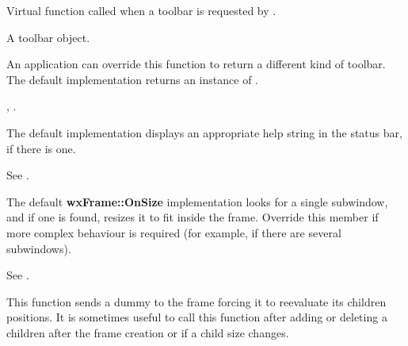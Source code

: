 Virtual function called when a toolbar is requested by .






A toolbar object.


An application can override this function to return a different kind of toolbar. The default
implementation returns an instance of .


, .

\label{wxframeonmenuhighlight}


The default implementation displays an appropriate help string
in the status bar, if there is one.

See .

\label{wxframeonsize}


The default {\bf wxFrame::OnSize} implementation looks for a single subwindow,
and if one is found, resizes it to fit
inside the frame. Override this member if more complex behaviour
is required (for example, if there are several subwindows).

See .

\label{wxframesendsizeevent}


This function sends a dummy  to the frame
forcing it to reevaluate its children positions. It is sometimes useful to call
this function after adding or deleting a children after the frame creation or
if a child size changes.

